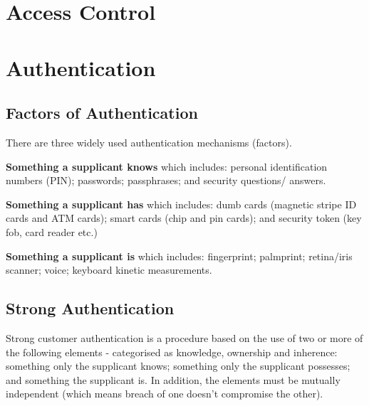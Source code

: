 \section*{Access Control}


\section*{Authentication}
\subsection*{Factors of Authentication}
There are three widely used authentication mechanisms (factors).

\textbf{Something a supplicant knows} which includes: personal identification numbers (PIN); passwords; passphrases; and security questions/ answers.

\textbf{Something a supplicant has} which includes: dumb cards (magnetic stripe ID cards and ATM cards); smart cards (chip and pin cards); and security token (key fob, card reader etc.)

\textbf{Something a supplicant is} which includes: fingerprint; palmprint; retina/iris scanner; voice; keyboard kinetic measurements.

\subsection*{Strong Authentication}
Strong customer authentication is a procedure based on the use of two or more of the following elements - categorised as knowledge, ownership and inherence: something only the supplicant knows; something only the supplicant possesses; and something the supplicant is. In addition, the elements must be mutually independent (which means breach of one doesn't compromise the other).

